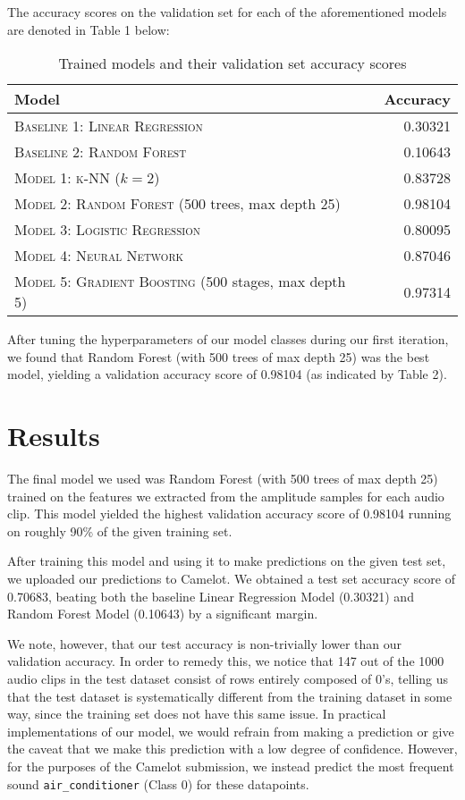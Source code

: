 \documentclass[11pt]{article}
\begin{document}
The accuracy scores on the validation set for each of the aforementioned models are denoted in Table 1 below:
\begin{table}[h!]
    \centering
    \begin{tabular}{llr}
     \toprule
     Model &  & Accuracy \\
     \midrule
     \textsc{Baseline 1: Linear Regression} & & 0.30321 \\
     \textsc{Baseline 2: Random Forest} & & 0.10643 \\
     \textsc{Model 1: k-NN} ($k=2$) & & 0.83728 \\
     \textsc{Model 2: Random Forest} (500 trees, max depth 25) & & 0.98104 \\
     \textsc{Model 3: Logistic Regression} & & 0.80095 \\
     \textsc{Model 4: Neural Network} & & 0.87046 \\
     \textsc{Model 5: Gradient Boosting} (500 stages, max depth 5) & & 0.97314 \\
     \bottomrule
    \end{tabular}
    \caption{\label{tab:results} Trained models and their validation set accuracy scores}
\end{table}

After tuning the hyperparameters of our model classes during our first iteration,  we found that Random Forest (with 500 trees of max depth 25) was the best model, yielding a validation accuracy score of 0.98104 (as indicated by Table 2).



\section{Results}
The final model we used was Random Forest (with 500 trees of max depth 25) trained on the features we extracted from the amplitude samples for each audio clip. This model yielded the highest validation accuracy score of 0.98104 running on roughly 90\% of the given training set.

After training this model and using it to make predictions on the given test set, we uploaded our predictions to Camelot. We obtained a test set accuracy score of 0.70683, beating both the baseline Linear Regression Model (0.30321) and Random Forest Model (0.10643) by a significant margin.

We note, however, that our test accuracy is non-trivially lower than our validation accuracy. In order to remedy this, we notice that 147 out of the 1000 audio clips in the test dataset consist of rows entirely composed of 0's, telling us that the test dataset is systematically different from the training dataset in some way, since the training set does not have this same issue. In practical implementations of our model, we would refrain from making a prediction or give the caveat that we make this prediction with a low degree of confidence. However, for the purposes of the Camelot submission, we instead predict the most frequent sound \texttt{air\_conditioner} (Class 0) for these datapoints.
\end{document}
